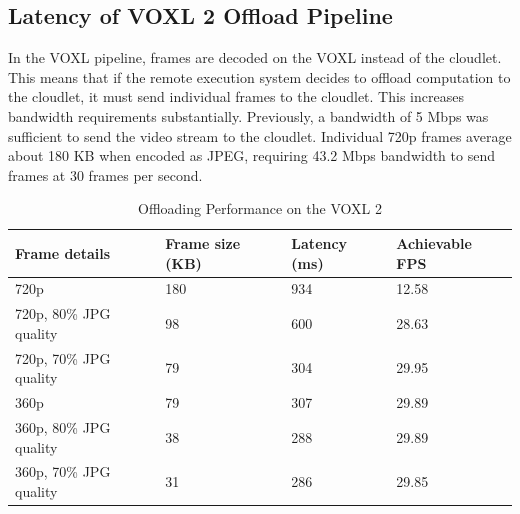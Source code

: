 \subsection{Latency of VOXL 2 Offload Pipeline}

In the VOXL pipeline, frames are decoded on the VOXL instead of the cloudlet.
This means that if the remote execution system decides to offload computation
to the cloudlet, it must send individual frames to the cloudlet. This increases
bandwidth requirements substantially. Previously, a bandwidth of 5 Mbps was
sufficient to send the video stream to the cloudlet. Individual 720p frames
average about 180 KB when encoded as JPEG, requiring 43.2 Mbps bandwidth to
send frames at 30 frames per second.

\begin{table}
    \centering
    \begin{tabular}{llll}
        \toprule
        \textbf{Frame details} & \textbf{Frame size (KB)} & \textbf{Latency (ms)} & \textbf{Achievable FPS}\\
        \midrule
        720p & 180 & 934 & 12.58\\
        720p, 80\% JPG quality  & 98 & 600 &28.63\\
        720p, 70\% JPG quality & 79 & 304 & 29.95\\
        360p & 79 & 307  &29.89 \\
        360p, 80\% JPG quality & 38 &288 & 29.89\\
        360p, 70\% JPG quality & 31 & 286 & 29.85\\
        \bottomrule
\end{tabular}
\caption{Offloading Performance on the VOXL 2}
\label{tab:voxl2-offload-performance}
\end{table}
